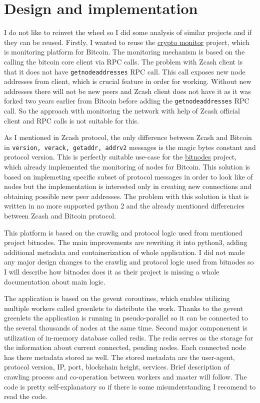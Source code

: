 \documentclass[11pt]{article}
\begin{document}
\section{Design and implementation}
\label{sec:org92d3d81}
I do not like to reinvet the wheel so I did some analysis of similar projects and if they can be reused.
Firstly, I wanted to reuse the \href{https://github.com/fruit098/crypto\_monitor}{crypto monitor} project, which is monitoring platform for Bitcoin. The monitoring mechanism is based on the calling the bitcoin core client via RPC calls. The problem with Zcash client is that it does not have \texttt{getnodeaddresses} RPC call. This call exposes new node addresses from client, which is crucial feature in order for working. Without new addresses there will not be new peers and Zcash client does not have it as it was forked two years earlier from Bitcoin before adding the \texttt{getnodeaddresses} RPC call. So the approach with monitoring the network with help of Zcash official client and RPC calls is not suitable for this.

As I mentioned in Zcash protocol, the only difference between Zcash and Bitcoin in \texttt{version, verack, getaddr, addrv2} messages is the magic bytes constant and protocol version. This is perfectly suitable use-case for the \href{https://github.com/ayeowch/bitnodes/}{bitnodes} project, which already implemented the monitoring of nodes for Bitcoin. This solution is based on implemeting specific subset of protocol messages in order to look like of nodes but the implementation is interested only in creating new connections and obtaining possible new peer addresses. The problem with this solution is that is written in no more supported python 2 and the already mentioned differencies between Zcash and Bitcoin protocol.

This platform is based on the crawlig and protocol logic used from mentioned project bitnodes. The main improvements are rewriting it into python3, adding additional metadata and containerization of whole application. I did not made any major design changes to the crawlig and protocol logic used from bitnodes so I will describe how bitnodes does it as their project is
missing a whole documentation about main logic.

The application is based on the gevent coroutines, which enables utilizing multiple workers called greenlets to distribute the work. Thanks to the gevent greenlets the application is running in pseudo-parallel so it can be connected to the several thousands of nodes at the same time. Second major componenent is utilization of in-memory database called redis. The redis serves as the storage for the information about current connected, pending nodes. Each connected node has there metadata stored as well. The stored metadata are the user-agent, protocol version, IP, port, blockchain height, services. Brief description of crawling process and co-operation between workers and master will follow. The code is pretty self-explanatory so if there is some misunderstanding I recomend to read the code.
\end{document}
